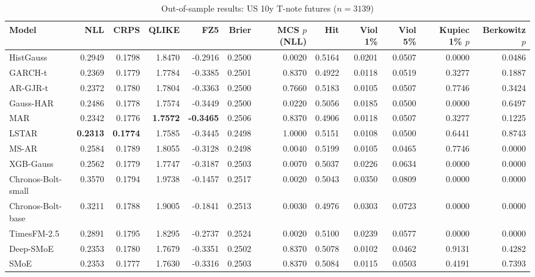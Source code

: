 \begin{table}[!htbp]\centering\scriptsize
\caption{Out-of-sample results: US 10y T-note futures ($n=3139$)}\label{tab:asset_zn_fut}
\begin{adjustbox}{max width=\textwidth}
\begin{tabular}{lrrrrrrrrrrr}
\toprule
Model & NLL & CRPS & QLIKE & FZ5 & Brier & MCS $p$ (NLL) & Hit & Viol 1\% & Viol 5\% & Kupiec 1\% $p$ & Berkowitz $p$\\
\midrule
HistGauss & 0.2949 & 0.1798 & 1.8470 & -0.2916 & 0.2500 & 0.0020 & 0.5164 & 0.0201 & 0.0507 & 0.0000 & 0.0486\\
GARCH-t & 0.2369 & 0.1779 & 1.7784 & -0.3385 & 0.2501 & 0.8370 & 0.4922 & 0.0118 & 0.0519 & 0.3277 & 0.1887\\
AR-GJR-t & 0.2372 & 0.1780 & 1.7804 & -0.3363 & 0.2500 & 0.7660 & 0.5183 & 0.0105 & 0.0507 & 0.7746 & 0.3424\\
Gauss-HAR & 0.2486 & 0.1778 & 1.7574 & -0.3449 & 0.2500 & 0.0220 & 0.5056 & 0.0185 & 0.0500 & 0.0000 & 0.6497\\
MAR & 0.2342 & 0.1776 & \textbf{1.7572} & \textbf{-0.3465} & 0.2506 & 0.8370 & 0.4906 & 0.0118 & 0.0507 & 0.3277 & 0.1225\\
LSTAR & \textbf{0.2313} & \textbf{0.1774} & 1.7585 & -0.3445 & 0.2498 & 1.0000 & 0.5151 & 0.0108 & 0.0500 & 0.6441 & 0.8743\\
MS-AR & 0.2584 & 0.1789 & 1.8055 & -0.3128 & 0.2498 & 0.0040 & 0.5199 & 0.0105 & 0.0465 & 0.7746 & 0.0000\\
XGB-Gauss & 0.2562 & 0.1779 & 1.7747 & -0.3187 & 0.2503 & 0.0070 & 0.5037 & 0.0226 & 0.0634 & 0.0000 & 0.0000\\
Chronos-Bolt-small & 0.3570 & 0.1794 & 1.9738 & -0.1457 & 0.2517 & 0.0020 & 0.5043 & 0.0350 & 0.0809 & 0.0000 & 0.0000\\
Chronos-Bolt-base & 0.3211 & 0.1788 & 1.9005 & -0.1841 & 0.2513 & 0.0030 & 0.4976 & 0.0303 & 0.0723 & 0.0000 & 0.0000\\
TimesFM-2.5 & 0.2891 & 0.1795 & 1.8295 & -0.2737 & 0.2524 & 0.0020 & 0.5100 & 0.0239 & 0.0577 & 0.0000 & 0.0000\\
Deep-SMoE & 0.2353 & 0.1780 & 1.7679 & -0.3351 & 0.2502 & 0.8370 & 0.5078 & 0.0102 & 0.0462 & 0.9131 & 0.4282\\
SMoE & 0.2353 & 0.1777 & 1.7630 & -0.3316 & 0.2503 & 0.8370 & 0.5084 & 0.0115 & 0.0503 & 0.4191 & 0.7393\\
\bottomrule
\end{tabular}
\end{adjustbox}
\end{table}